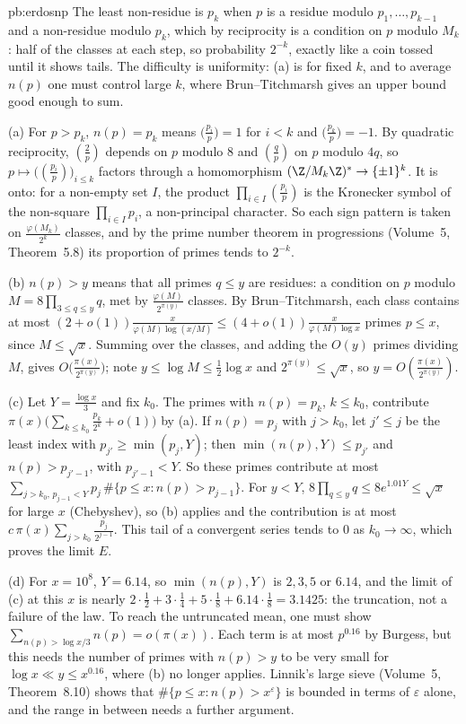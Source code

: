 \begin{solution}{pb:erdosnp}
\idea The least non-residue is $p_k$ when $p$ is a residue modulo $p_1,\dots,p_{k-1}$ and a non-residue modulo $p_k$, which by reciprocity is a condition on $p$ modulo $M_k$: half of the
classes at each step, so probability $2^{-k}$, exactly like a coin tossed until it shows tails. The difficulty is uniformity: (a) is for fixed $k$, and to average $n(p)$ one must control
large $k$, where Brun--Titchmarsh gives an upper bound good enough to sum.

\writeup (a) For $p>p_k$, $n(p)=p_k$ means $\bigl(\frac{p_i}p\bigr)=1$ for $i<k$ and $\bigl(\frac{p_k}p\bigr)=-1$. By quadratic reciprocity, $(\frac2p)$ depends on $p$ modulo $8$ and $(\frac qp)$
on $p$ modulo $4q$, so $p\mapsto\bigl((\frac{p_i}p)\bigr)_{i\le k}$ factors through a homomorphism $(\Z/M_k\Z)^*\to\{\pm1\}^k$. It is onto: for a non-empty set $I$, the product
$\prod_{i\in I}(\frac{p_i}p)$ is the Kronecker symbol of the non-square $\prod_{i\in I}p_i$, a non-principal character. So each sign pattern is taken on $\frac{\varphi(M_k)}{2^k}$ classes,
and by the prime number theorem in progressions (Volume~5, Theorem~5.8) its proportion of primes tends to $2^{-k}$.

(b) $n(p)>y$ means that all primes $q\le y$ are residues: a condition on $p$ modulo $M=8\prod_{3\le q\le y}q$, met by $\frac{\varphi(M)}{2^{\pi(y)}}$ classes. By Brun--Titchmarsh, each class
contains at most $(2+o(1))\frac x{\varphi(M)\log(x/M)}\le(4+o(1))\frac x{\varphi(M)\log x}$ primes $p\le x$, since $M\le\sqrt x$. Summing over the classes, and adding the $O(y)$ primes
dividing $M$, gives $O\bigl(\frac{\pi(x)}{2^{\pi(y)}}\bigr)$; note $y\le\log M\le\frac12\log x$ and $2^{\pi(y)}\le\sqrt x$, so $y=O(\frac{\pi(x)}{2^{\pi(y)}})$.

(c) Let $Y=\frac{\log x}3$ and fix $k_0$. The primes with $n(p)=p_k$, $k\le k_0$, contribute $\pi(x)\bigl(\sum_{k\le k_0}\frac{p_k}{2^k}+o(1)\bigr)$ by (a). If $n(p)=p_j$ with $j>k_0$, let $j'\le j$
be the least index with $p_{j'}\ge\min(p_j,Y)$; then $\min(n(p),Y)\le p_{j'}$ and $n(p)>p_{j'-1}$, with $p_{j'-1}<Y$. So these primes contribute at most
$\sum_{j>k_0,\,p_{j-1}<Y}p_j\,\#\{p\le x:n(p)>p_{j-1}\}$. For $y<Y$, $8\prod_{q\le y}q\le8e^{1.01Y}\le\sqrt x$ for large $x$ (Chebyshev), so (b) applies and the contribution is at most
$c\,\pi(x)\sum_{j>k_0}\frac{p_j}{2^{j-1}}$. This tail of a convergent series tends to $0$ as $k_0\to\infty$, which proves the limit $E$.

(d) For $x=10^8$, $Y=6.14$, so $\min(n(p),Y)$ is $2,3,5$ or $6.14$, and the limit of (c) at this $x$ is nearly $2\cdot\frac12+3\cdot\frac14+5\cdot\frac18+6.14\cdot\frac18=3.1425$: the
truncation, not a failure of the law. To reach the untruncated mean, one must show $\sum_{n(p)>\log x/3}n(p)=o(\pi(x))$. Each term is at most $p^{0.16}$ by Burgess, but this needs the
number of primes with $n(p)>y$ to be very small for $\log x\ll y\le x^{0.16}$, where (b) no longer applies. Linnik's large sieve (Volume~5, Theorem~8.10) shows that
$\#\{p\le x:n(p)>x^\varepsilon\}$ is bounded in terms of $\varepsilon$ alone, and the range in between needs a further argument.


\end{solution}
